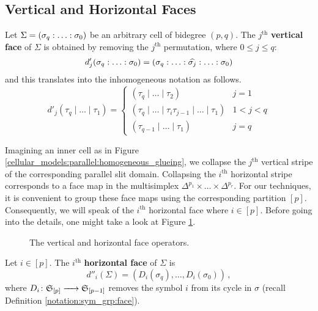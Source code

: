 \subsection{Vertical and Horizontal Faces}
\label{cellular_models:parallel:faces}

\begin{defi}
\label{cellular_models:parallel:dv}
Let $\Sigma = \homogq$ be an arbitrary cell of bidegree $(p,q)$.
The $j^{\text{th}}$ {\bfseries vertical face} of $\Sigma$ is obtained by removing the $j^{\text{th}}$ permutation, where $0 \le j \le q$:
\[
    d'_j \homogq = (\sigma_q: \ldots: \widehat{\sigma_j}: \ldots: \sigma_0)
\]
and this translates into the inhomogeneous notation as follows.
\[
    d'_j(\tau_q \mid \ldots \mid \tau_1) =
        \begin{cases}
            (\tau_q \mid \ldots \mid \tau_2) & j = 1 \\
            (\tau_q \mid \ldots \mid \tau_i \tau_{j-1} \mid \ldots \mid \tau_1) & 1 < j < q \\
            (\tau_{q-1} \mid \ldots \mid \tau_1) & j = q
        \end{cases}
\]
\end{defi}

Imagining an inner cell as in Figure \ref{cellular_models:parallel:homogeneous_glueing}, we collapse the $j^{\text{th}}$ vertical stripe of the corresponding parallel slit domain.
Collapsing the $i^{\text{th}}$ horizontal stripe corresponds to a face map in the multisimplex $\Delta^{p_1} \times \ldots \times \Delta^{p_r}$.
For our techniques, it is convenient to group these face maps using the corresponding partition $[p]$.
Consequently, we will speak of the $i^{\text{th}}$ horizontal face where $i \in [p]$.
Before going into the details, one might take a look at Figure \ref{cellular_models:parallel:comparison_face_operators}.
\begin{figure}[ht]
\centering
{}
\caption{\label{cellular_models:parallel:comparison_face_operators}The vertical and horizontal face operators.}
\end{figure}

\begin{defi}
\label{cellular_models:parallel:dh}
Let $i \in [p]$.
The $i^{\text{th}}$ {\bfseries horizontal face} of $\Sigma$ is
\[ 
    d''_i(\Sigma) = (D_i(\sigma_q), \dotsc, D_i(\sigma_0))\,,
\]
where $D_i \colon \mathfrak S_{[p]} \xrightarrow{\hspace{6pt}{}\hspace{6pt}} \mathfrak S_{[p-1]}$ removes the symbol $i$ from its cycle in $\sigma$ (recall Definition \ref{notation:sym_grp:face}).
\end{defi}

